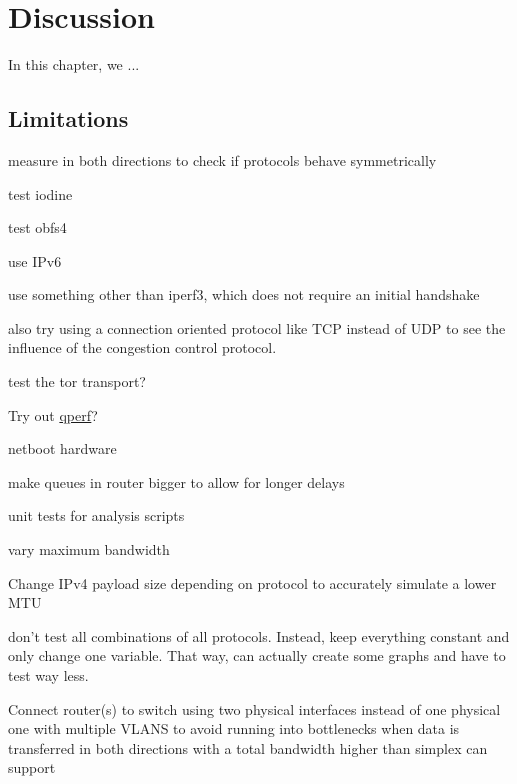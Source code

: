 
\chapter{Discussion}
\label{chap:discussion}
In this chapter, we ...

\section{Limitations}

measure in both directions to check if protocols behave symmetrically

test iodine

test obfs4

use IPv6

use something other than iperf3, which does not require an initial handshake

also try using a connection oriented protocol like TCP instead of UDP to see the influence of the congestion control protocol.

test the tor transport? 

Try out \href{https://github.com/rbruenig/qperf}{qperf}?

netboot hardware

make queues in router bigger to allow for longer delays

unit tests for analysis scripts

vary maximum bandwidth

Change IPv4 payload size depending on protocol to accurately simulate a lower MTU

don't test all combinations of all protocols.
Instead, keep everything constant and only change one variable.
That way, can actually create some graphs and have to test way less.


Connect router(s) to switch using two physical interfaces instead of one physical one with multiple VLANS to avoid running into bottlenecks when data is transferred in both directions with a total bandwidth higher than simplex can support
